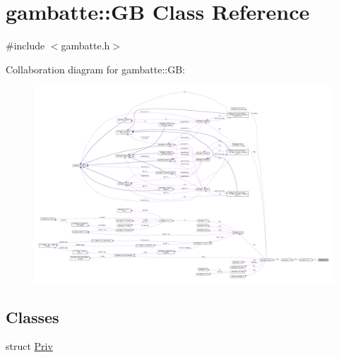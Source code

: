 \hypertarget{classgambatte_1_1GB}{}\section{gambatte\+:\+:GB Class Reference}
\label{classgambatte_1_1GB}


{\ttfamily \#include $<$gambatte.\+h$>$}



Collaboration diagram for gambatte\+:\+:GB\+:
\nopagebreak
\begin{figure}[H]
\begin{center}
\leavevmode
\includegraphics[width=350pt]{classgambatte_1_1GB__coll__graph}
\end{center}
\end{figure}
\subsection*{Classes}
\begin{DoxyCompactItemize}
\item 
struct \hyperlink{structgambatte_1_1GB_1_1Priv}{Priv}
\end{DoxyCompactItemize}
